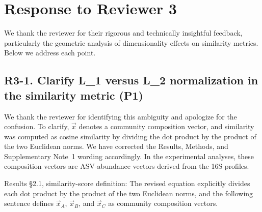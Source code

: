 \section*{Response to Reviewer 3}

We thank the reviewer for their rigorous and technically insightful feedback, particularly the geometric analysis of dimensionality effects on similarity metrics. Below we address each point.

\subsection*{R3-1. Clarify L\_1 versus L\_2 normalization in the similarity metric (P1)}


\responselabel
We thank the reviewer for identifying this ambiguity and apologize for the confusion. To clarify, $\vec{x}$ denotes a community composition vector, and similarity was computed as cosine similarity by dividing the dot product by the product of the two Euclidean norms. We have corrected the Results, Methods, and Supplementary Note~1 wording accordingly. In the experimental analyses, these composition vectors are ASV-abundance vectors derived from the 16S profiles.


Results \S2.1, similarity-score definition:  The revised equation explicitly divides each dot product by the product of the two Euclidean norms, and the following sentence defines $\vec{x}_A$, $\vec{x}_B$, and $\vec{x}_C$ as community composition vectors.


